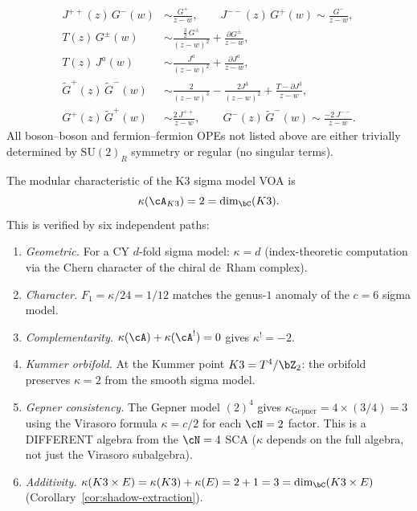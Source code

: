 \begin{definition}[Small $\cN = 4$ SCA at $c = 6$]
\begin{align}
J^{++}(z)\,G^-(w) &\sim \frac{G^+}{z-w},\qquad
J^{--}(z)\,G^+(w) \sim \frac{G^-}{z-w}, \label{eq:n4-JpmGmp} \\
T(z)\,G^\pm(w) &\sim \frac{\tfrac{3}{2}\,G^\pm}{(z-w)^2}
 + \frac{\partial G^\pm}{z-w}, \label{eq:n4-TG} \\
T(z)\,J^a(w) &\sim \frac{J^a}{(z-w)^2} + \frac{\partial J^a}{z-w},
 \label{eq:n4-TJ} \\
\tilde{G}^+(z)\,\tilde{G}^-(w) &\sim \frac{2}{(z-w)^3}
 - \frac{2J^3}{(z-w)^2}
 + \frac{T - \partial J^3}{z-w}, \label{eq:n4-GtpGtm} \\
G^+(z)\,\tilde{G}^+(w) &\sim \frac{2\,J^{++}}{z-w},\qquad
G^-(z)\,\tilde{G}^-(w) \sim \frac{-2\,J^{--}}{z-w}.
 \label{eq:n4-GGt-cross}
\end{align}
All boson--boson and fermion--fermion OPEs not listed above
are either trivially determined by $\mathrm{SU}(2)_R$ symmetry
or regular \textup{(}no singular terms\textup{)}.
\end{definition}

\begin{proposition}
\label{prop:kappa-k3}
The modular characteristic of the K3 sigma model VOA is
\begin{equation}\label{eq:kappa-k3}
\kappa(\cA_{K3}) = 2 = \dim_\bC(K3).
\end{equation}
This is verified by six independent paths:
\begin{enumerate}[label=\textup{(\roman*)}]
\item \emph{Geometric.} For a CY $d$-fold sigma model:
 $\kappa = d$ \textup{(}index-theoretic computation via
 the Chern character of the chiral de~Rham complex\textup{)}.
\item \emph{Character.} $F_1 = \kappa/24 = 1/12$ matches the
 genus-$1$ anomaly of the $c = 6$ sigma model.
\item \emph{Complementarity.} $\kappa(\cA) + \kappa(\cA^!)
 = 0$ gives $\kappa^! = -2$.
\item \emph{Kummer orbifold.} At the Kummer point $K3 = T^4/\bZ_2$:
 the orbifold preserves $\kappa = 2$ from the smooth sigma model.
\item \emph{Gepner consistency.} The Gepner model $(2)^4$ gives
 $\kappa_{\mathrm{Gepner}} = 4 \times (3/4) = 3$ using the
 Virasoro formula $\kappa = c/2$ for each $\cN = 2$ factor.
 This is a DIFFERENT algebra from the $\cN = 4$ SCA
 \textup{(}$\kappa$ depends on the full algebra,
 not just the Virasoro subalgebra\textup{)}.
\item \emph{Additivity.} $\kappa(K3 \times E) =
 \kappa(K3) + \kappa(E) = 2 + 1 = 3 = \dim_\bC(K3 \times E)$
 \textup{(}Corollary~\textup{\ref{cor:shadow-extraction})}.
\end{enumerate}
\end{proposition}

